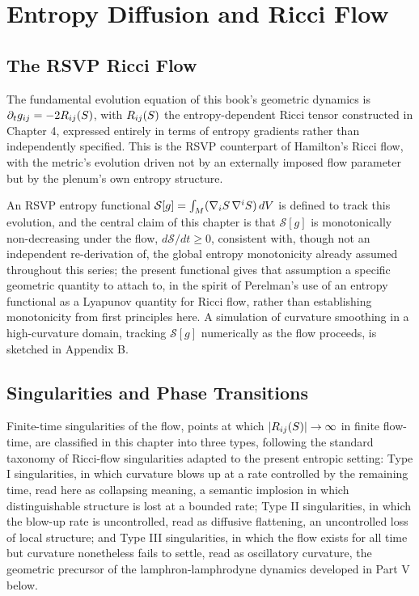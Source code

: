 \part{Entropy Diffusion and Ricci Flow}

\chapter{The RSVP Ricci Flow}

The fundamental evolution equation of this book's geometric dynamics is $\partial_t g_{ij} = -2 R_{ij}(S)$, with $R_{ij}(S)$ the entropy-dependent Ricci tensor constructed in Chapter 4, expressed entirely in terms of entropy gradients rather than independently specified. This is the RSVP counterpart of Hamilton's Ricci flow, with the metric's evolution driven not by an externally imposed flow parameter but by the plenum's own entropy structure.

An RSVP entropy functional $\mathcal{S}[g] = \int_M (\nabla_i S \, \nabla^i S) \, dV$ is defined to track this evolution, and the central claim of this chapter is that $\mathcal{S}[g]$ is monotonically non-decreasing under the flow, $d\mathcal{S}/dt \geq 0$, consistent with, though not an independent re-derivation of, the global entropy monotonicity already assumed throughout this series; the present functional gives that assumption a specific geometric quantity to attach to, in the spirit of Perelman's use of an entropy functional as a Lyapunov quantity for Ricci flow, rather than establishing monotonicity from first principles here. A simulation of curvature smoothing in a high-curvature domain, tracking $\mathcal{S}[g]$ numerically as the flow proceeds, is sketched in Appendix B.

\chapter{Singularities and Phase Transitions}

Finite-time singularities of the flow, points at which $|R_{ij}(S)| \to \infty$ in finite flow-time, are classified in this chapter into three types, following the standard taxonomy of Ricci-flow singularities adapted to the present entropic setting: Type I singularities, in which curvature blows up at a rate controlled by the remaining time, read here as collapsing meaning, a semantic implosion in which distinguishable structure is lost at a bounded rate; Type II singularities, in which the blow-up rate is uncontrolled, read as diffusive flattening, an uncontrolled loss of local structure; and Type III singularities, in which the flow exists for all time but curvature nonetheless fails to settle, read as oscillatory curvature, the geometric precursor of the lamphron-lamphrodyne dynamics developed in Part V below.

